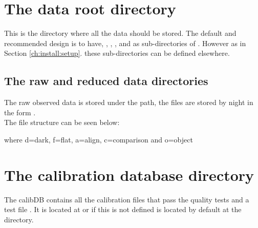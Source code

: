 \section{The data root directory}
\label{ch:data_architecture:data_root_folder}

This is the directory where all the data should be stored. The default and recommended design is to have, , , , and  as sub-directories of . However as in Section \ref{ch:install:setup}. these sub-directories can be defined elsewhere.

\subsection{The raw and reduced data directories}
\label{ch:data_architecture:data_root_folderraw_folder}
The raw observed data is stored under the  path, the files are stored by night in the form \constantFolderDateFormat. \\

\noindent The file structure can be seen below:
\begin{tcustomdir}
\end{tcustomdir}

where d=dark, f=flat, a=align, c=comparison and o=object

\clearpage
\newpage
\section{The calibration database directory}
\label{ch:data_architecture:calibDB}
\begin{tcustomdir}
\end{tcustomdir}
\noindent The calibDB contains all the calibration files that pass the quality tests and a test file \masterCALIBDBfile. It is located at  or if this is not defined is located by default at the  directory.

